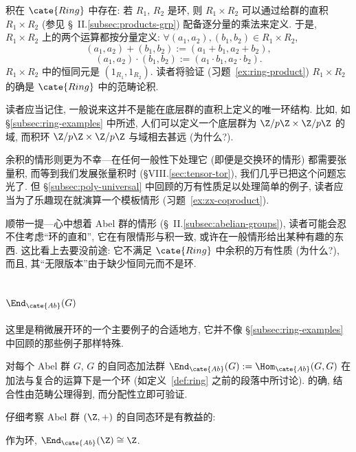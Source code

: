 积在 $\cate{Ring}$ 中存在: 若 $R_1$, $R_2$ 是环, 则 $R_1 \times R_2$ 可以通过给群的直积 $R_1 \times R_2$ (参见 \S~II.\ref{subsec:products-grp}) 配备逐分量的乘法来定义. 于是, $R_1 \times R_2$ 上的两个运算都按分量定义: $\forall (a_1,a_2),(b_1,b_2)\in R_1\times R_2$,
\[
(a_1, a_2) + (b_1, b_2) := (a_1 + b_1, a_2 + b_2),
\]
\[
(a_1, a_2) \cdot (b_1, b_2) := (a_1 \cdot b_1, a_2 \cdot b_2).
\]
$R_1 \times R_2$ 中的恒同元是 $(1_{R_1}, 1_{R_2})$. 读者将验证 (习题~\ref{ex:ring-product}) $R_1 \times R_2$ 的确是 $\cate{Ring}$ 中的范畴论积.

读者应当记住, 一般说来这并不是能在底层群的直积上定义的唯一环结构. 比如, 如 \S\ref{subsec:ring-examples} 中所述, 人们可以定义一个底层群为 $\Z/p\Z \times \Z/p\Z$ 的域, 而积环 $\Z/p\Z \times \Z/p\Z$ 与域相去甚远 (为什么?).

余积的情形则更为不幸---在任何一般性下处理它 (即便是交换环的情形) 都需要张量积, 而等到我们发展张量积时 (\S VIII.\ref{sec:tensor-tor}), 我们几乎已把这个问题忘光了. 但 \S\ref{subsec:poly-universal} 中回顾的万有性质足以处理简单的例子, 读者应当为了乐趣现在就演算一个模板情形 (习题~\ref{ex:zx-coproduct}).

顺带一提---心中想着 Abel 群的情形 (\S~II.\ref{subsec:abelian-groups}), 读者可能会忍不住考虑``环的直和'', 它在有限情形与积一致, 或许在一般情形给出某种有趣的东西. 这比看上去要没前途: 它不满足 $\cate{Ring}$ 中余积的万有性质 (为什么?), 而且, 其``无限版本''由于缺少恒同元而不是环.

\subsection{\texorpdfstring{$\End_{\cate{Ab}}(G)$}{EndAb(G)}}
\label{subsec:end-ring}

这里是稍微展开环的一个主要例子的合适地方, 它并不像 \S\ref{subsec:ring-examples} 中回顾的那些例子那样特殊.

对每个 Abel 群 $G$, $G$ 的自同态加法群 $\End_{\cate{Ab}}(G) := \Hom_{\cate{Ab}}(G, G)$ 在加法与复合的运算下是一个环 (如定义~\ref{def:ring} 之前的段落中所讨论). 的确, 结合性由范畴公理得到, 而分配性立即可验证.

仔细考察 Abel 群 $(\Z, +)$ 的自同态环是有教益的:

\begin{proposition}
\label{prop:end-z}
作为环, $\End_{\cate{Ab}}(\Z) \cong \Z$.
\end{proposition}

